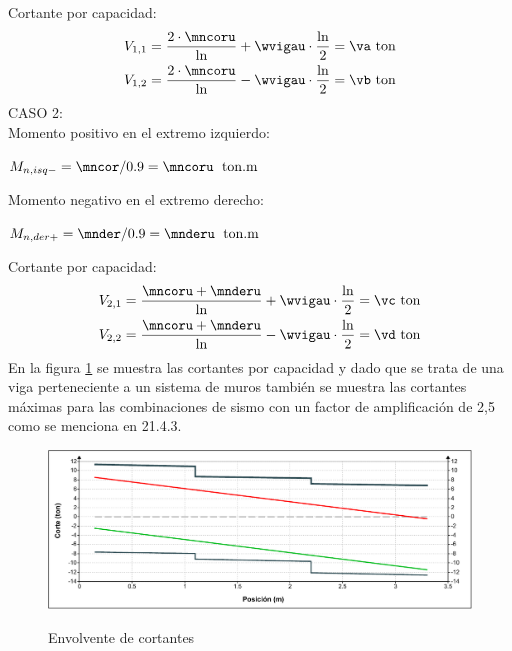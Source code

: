 Cortante por capacidad:
\begin{align*}
V_{1,1}&=\frac{2\cdot\mncoru}{\ln} + \wvigau  \cdot \frac{\ln}{2}=\va\text {~ton}\\
V_{1,2}&=\frac{2\cdot\mncoru}{\ln} - \wvigau  \cdot \frac{\ln}{2}=\vb\text {~ton}
\end{align*}
CASO 2:\\
Momento positivo en el extremo izquierdo: 
\begin{center}
$M_{n,isq-}=\mncor/0.9=\mncoru\;\mathrm{~ton.m}$
\end{center}
Momento negativo en el extremo derecho: 
\begin{center}
$\displaystyle M_{n,der+}=\mnder/0.9=\mnderu\;\mathrm{~ton.m}$
\end{center}
Cortante por capacidad:
\begin{align*}
V_{2,1}=\frac{\mncoru+\mnderu}{\ln} + \wvigau  \cdot \frac{\ln}{2}=\vc\text {~ton}\\
V_{2,2}=\frac{\mncoru+\mnderu}{\ln} - \wvigau  \cdot \frac{\ln}{2}=\vd\text {~ton}
\end{align*}
En la figura \ref{cor} se muestra las cortantes por capacidad y dado que se trata de una viga perteneciente a un sistema de muros también se muestra las cortantes máximas para las combinaciones de sismo con un factor de amplificación de 2,5 como se menciona en 21.4.3.
\newpage
\begin{figure}[h!]
    \centering
    \caption{Envolvente de cortantes}
    \includegraphics[scale=0.7]{IMAGENES/corta.pdf}
    \label{cor}
\end{figure}

